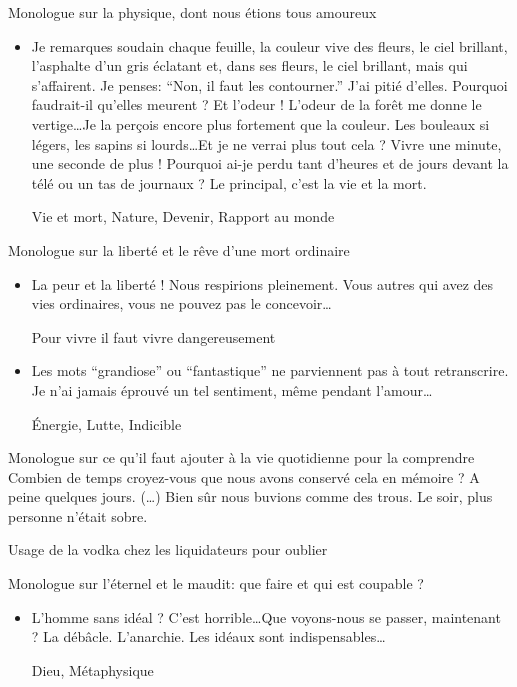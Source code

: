 \documentclass[french,a4paper,11pt,answers]{exam}
\newcommand{\cit}[2]{\og #1 \fg{} \begin{solution}{ #2 }\end{solution}} %
\begin{document}
    \begin{cadre}{Monologue sur la physique{,} dont nous étions tous amoureux}
	\begin{itemize}
	    \item \cit{Je remarques soudain chaque feuille, la couleur vive des fleurs, le ciel brillant, l'asphalte d'un gris éclatant et, dans ses fleurs, le ciel brillant, mais qui s'affairent. Je penses: “Non, il faut les contourner.'' J'ai pitié d'elles. Pourquoi faudrait-il qu'elles meurent ? Et l'odeur ! L'odeur de la forêt me donne le vertige\ldots Je la perçois encore plus fortement que la couleur. Les bouleaux si légers, les sapins si lourds\ldots Et je ne verrai plus tout cela ? Vivre une minute, une seconde de plus ! Pourquoi ai-je perdu tant d'heures et de jours devant la télé ou un tas de journaux ? Le principal, c'est la vie et la mort.}
		{Vie et mort, Nature, Devenir, Rapport au monde}
	\end{itemize}
    \end{cadre}

    \begin{cadre}{Monologue sur la liberté et le rêve d'une mort ordinaire}
	\begin{itemize}
	    \item \cit{La peur et la liberté ! Nous respirions pleinement. Vous autres qui avez des vies ordinaires, vous ne pouvez pas le concevoir\ldots}
		{Pour vivre il faut vivre dangereusement}
	    \item \cit{Les mots “grandiose'' ou “fantastique'' ne parviennent pas à tout retranscrire. Je n'ai jamais éprouvé un tel sentiment, même pendant l'amour\ldots}
		{Énergie, Lutte, Indicible}
	\end{itemize}
    \end{cadre}

    \begin{cadre}{Monologue sur ce qu'il faut ajouter à la vie quotidienne pour la comprendre}
	\cit {Combien de temps croyez-vous que nous avons conservé cela en mémoire ? A peine quelques jours. (\dots) Bien sûr nous buvions comme des trous. Le soir, plus personne n'était sobre.}
	{Usage de la vodka chez les liquidateurs pour oublier}
    \end{cadre}

    \begin{cadre}{Monologue sur l'éternel et le maudit: que faire et qui est coupable ?}
	\begin{itemize}
	    \item \cit{L'homme sans idéal ? C'est horrible\ldots Que voyons-nous se passer, maintenant ? La débâcle. L'anarchie. Les idéaux sont indispensables\ldots}
		{Dieu, Métaphysique}
	\end{itemize}
    \end{cadre}
\end{document}
